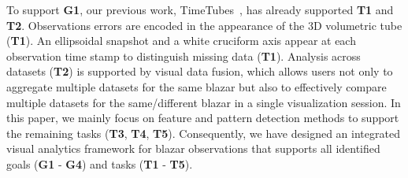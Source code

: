 To support \textbf{G1}, our previous work, TimeTubes~\cite{Fujishiro2018}, has already supported \textbf{T1} and \textbf{T2}.
Observations errors are encoded in the appearance of the 3D volumetric tube (\textbf{T1}).
An ellipsoidal snapshot and a white cruciform axis appear at each observation time stamp to distinguish missing data (\textbf{T1}).
Analysis across datasets (\textbf{T2}) is supported by visual data fusion, which allows users not only to aggregate multiple datasets for the same blazar but also to effectively compare multiple datasets for the same/different blazar in a single visualization session.
In this paper, we mainly focus on feature and pattern detection methods to support the remaining tasks (\textbf{T3}, \textbf{T4}, \textbf{T5}).
Consequently, we have designed an integrated visual analytics framework for blazar observations that supports all identified goals (\textbf{G1} - \textbf{G4}) and tasks (\textbf{T1} - \textbf{T5}).



